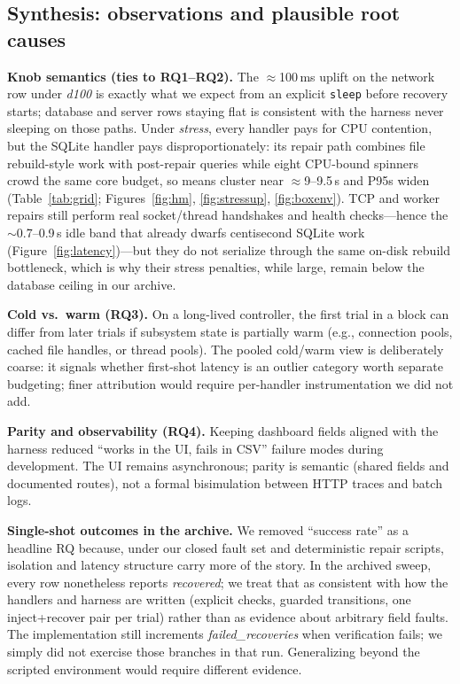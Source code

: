 \documentclass[sigconf,authorversion,nonacm]{acmart}
\begin{document}
\subsection{Synthesis: observations and plausible root causes}
\textbf{Knob semantics (ties to RQ1--RQ2).} The $\approx$100\,ms uplift on the network row under \emph{d100} is exactly what we expect from an explicit \texttt{sleep} before recovery starts; database and server rows staying flat is consistent with the harness never sleeping on those paths. Under \emph{stress}, every handler pays for CPU contention, but the SQLite handler pays disproportionately: its repair path combines file rebuild-style work with post-repair queries while eight CPU-bound spinners crowd the same core budget, so means cluster near $\approx$9--9.5\,s and P95s widen (Table~\ref{tab:grid}; Figures~\ref{fig:hm}, \ref{fig:stressup}, \ref{fig:boxenv}). TCP and worker repairs still perform real socket/thread handshakes and health checks---hence the $\sim$0.7--0.9\,s idle band that already dwarfs centisecond SQLite work (Figure~\ref{fig:latency})---but they do not serialize through the same on-disk rebuild bottleneck, which is why their stress penalties, while large, remain below the database ceiling in our archive.

\textbf{Cold vs.\ warm (RQ3).} On a long-lived controller, the first trial in a block can differ from later trials if subsystem state is partially warm (e.g., connection pools, cached file handles, or thread pools). The pooled cold/warm view is deliberately coarse: it signals whether first-shot latency is an outlier category worth separate budgeting; finer attribution would require per-handler instrumentation we did not add.

\textbf{Parity and observability (RQ4).} Keeping dashboard fields aligned with the harness reduced ``works in the UI, fails in CSV'' failure modes during development. The UI remains asynchronous; parity is semantic (shared fields and documented routes), not a formal bisimulation between HTTP traces and batch logs.

\textbf{Single-shot outcomes in the archive.} We removed ``success rate'' as a headline RQ because, under our closed fault set and deterministic repair scripts, isolation and latency structure carry more of the story. In the archived sweep, every row nonetheless reports \emph{recovered}; we treat that as consistent with how the handlers and harness are written (explicit checks, guarded transitions, one inject+recover pair per trial) rather than as evidence about arbitrary field faults. The implementation still increments \emph{failed\_recoveries} when verification fails; we simply did not exercise those branches in that run. Generalizing beyond the scripted environment would require different evidence.
\end{document}
